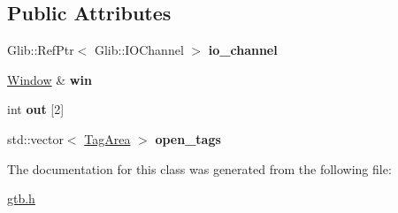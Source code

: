 \subsection*{Public Attributes}
\begin{DoxyCompactItemize}
\item 
\mbox{\label{a00040_aa06ef2d39a55d328bc3b5ab04e9fbb56}} 
Glib\+::\+Ref\+Ptr$<$ Glib\+::\+I\+O\+Channel $>$ {\bfseries io\+\_\+channel}
\item 
\mbox{\label{a00040_acd65a1e5aa62a7196bf446a3b2e1ffe7}} 
\hyperlink{a00036}{Window} \& {\bfseries win}
\item 
\mbox{\label{a00040_aaa74a33fe110ad4d7d17a61b229d5d0f}} 
int {\bfseries out} \mbox{[}2\mbox{]}
\item 
\mbox{\label{a00040_a231de93d97ba3685adb6559952747826}} 
std\+::vector$<$ \hyperlink{a00032}{Tag\+Area} $>$ {\bfseries open\+\_\+tags}
\end{DoxyCompactItemize}


The documentation for this class was generated from the following file\+:\begin{DoxyCompactItemize}
\item 
\hyperlink{a00005}{gtb.\+h}\end{DoxyCompactItemize}
